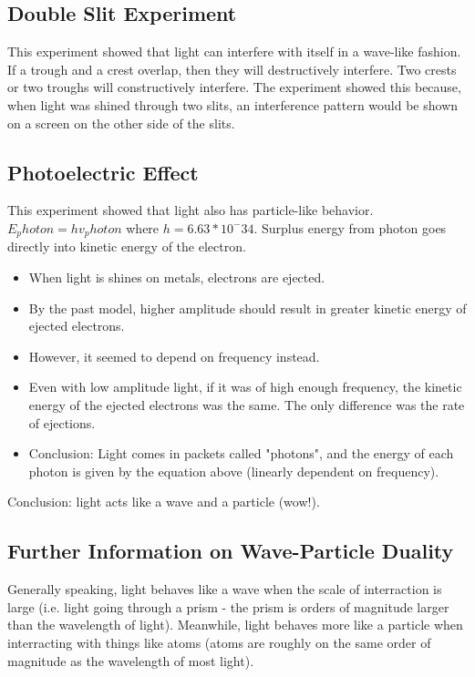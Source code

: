 \documentclass[a4paper,12pt]{report}
\begin{document}
\subsection{Double Slit Experiment}
This experiment showed that light can interfere with itself in a wave-like fashion. If a trough and a crest overlap, then they will destructively interfere. Two crests or two troughs will constructively interfere.
The experiment showed this because, when light was shined through two slits, an interference pattern would be shown on a screen on the other side of the slits.

\subsection{Photoelectric Effect}
This experiment showed that light also has particle-like behavior. $E_photon = hv_photon$ where $h = 6.63*10^-34$. Surplus energy from photon goes directly into kinetic energy of the electron.
\begin{itemize}
\item When light is shines on metals, electrons are ejected.
\item By the past model, higher amplitude should result in greater kinetic energy of ejected electrons.
\item However, it seemed to depend on frequency instead.
\item Even with low amplitude light, if it was of high enough frequency, the kinetic energy of the ejected electrons was the same. The only difference was the rate of ejections.
\item Conclusion: Light comes in packets called "photons", and the energy of each photon is given by the equation above (linearly dependent on frequency). 
\end{itemize}
Conclusion: light acts like a wave and a particle (wow!).

\subsection{Further Information on Wave-Particle Duality}
Generally speaking, light behaves like a wave when the scale of interraction is large (i.e. light going through a prism - the prism is orders of magnitude larger than the wavelength of light). Meanwhile, light behaves more like a particle when interracting with things like atoms (atoms are roughly on the same order of magnitude as the wavelength of most light).
\end{document}
